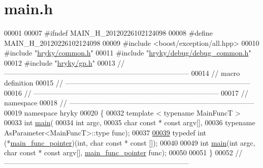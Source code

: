 \hypertarget{main_8h_source}{\section{main.\-h}
}

\begin{DoxyCode}
00001 
00007 \textcolor{preprocessor}{#ifndef MAIN\_H\_20120226102124098}
00008 \textcolor{preprocessor}{}\textcolor{preprocessor}{#define MAIN\_H\_20120226102124098}
00009 \textcolor{preprocessor}{}\textcolor{preprocessor}{#include <boost/exception/all.hpp>}
00010 \textcolor{preprocessor}{#include "\hyperlink{common_8h}{hryky/common.h}"}
00011 \textcolor{preprocessor}{#include "\hyperlink{debug__common_8h}{hryky/debug/debug_common.h}"}
00012 \textcolor{preprocessor}{#include "\hyperlink{gp_8h}{hryky/gp.h}"}
00013 \textcolor{comment}{//
      ------------------------------------------------------------------------------}
00014 \textcolor{comment}{// macro definition}
00015 \textcolor{comment}{//
      ------------------------------------------------------------------------------}
00016 \textcolor{comment}{//
      ------------------------------------------------------------------------------}
00017 \textcolor{comment}{// namespace}
00018 \textcolor{comment}{//
      ------------------------------------------------------------------------------}
00019 \textcolor{keyword}{namespace }hryky
00020 \{
00032     \textcolor{keyword}{template} < \textcolor{keyword}{typename} MainFuncT >
00033     \textcolor{keywordtype}{int} \hyperlink{namespacehryky_acf43d20e6c0b5e4b54931d42b46443a1}{main}(
00034         \textcolor{keywordtype}{int} argc,
00035         \textcolor{keywordtype}{char} \textcolor{keyword}{const} * \textcolor{keyword}{const} argv[],
00036         \textcolor{keyword}{typename} AsParameter<MainFuncT>::type func);
00037 
\hypertarget{main_8h_source_l00039}{}\hyperlink{namespacehryky_a9135850015ed231a278a8871bef3d80e}{00039}     \textcolor{keyword}{typedef} int (*\hyperlink{namespacehryky_a9135850015ed231a278a8871bef3d80e}{main_func_pointer})(int, \textcolor{keywordtype}{char} \textcolor{keyword}{const} * \textcolor{keyword}{const} []);
00040 
00049     \textcolor{keywordtype}{int} \hyperlink{namespacehryky_acf43d20e6c0b5e4b54931d42b46443a1}{main}(\textcolor{keywordtype}{int} argc, \textcolor{keywordtype}{char} \textcolor{keyword}{const} * \textcolor{keyword}{const} argv[], \hyperlink{namespacehryky_a9135850015ed231a278a8871bef3d80e}{main_func_pointer} func);
00050 
00051 \}
00052 \textcolor{comment}{//
      ------------------------------------------------------------------------------}

\end{DoxyCode}
